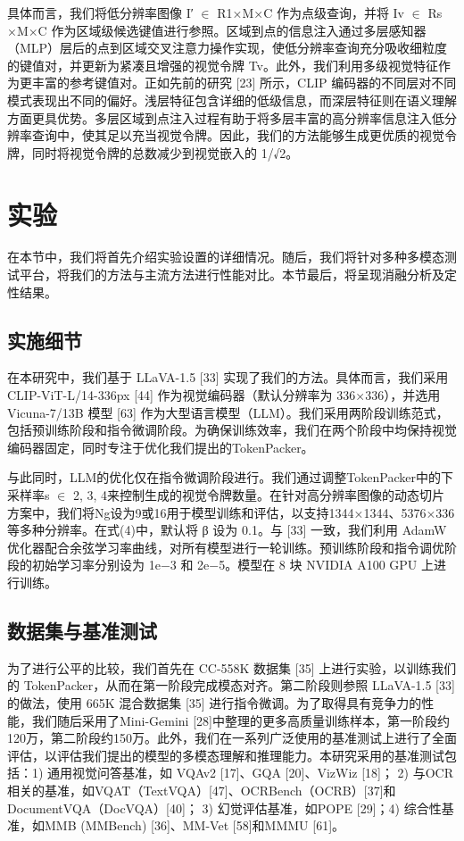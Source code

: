 具体而言，我们将低分辨率图像 I′ $\in$ R1×M×C 作为点级查询，并将 Iv $\in$ Rs ×M×C 作为区域级候选键值进行参照。区域到点的信息注入通过多层感知器（MLP）层后的点到区域交叉注意力操作实现，使低分辨率查询充分吸收细粒度的键值对，并更新为紧凑且增强的视觉令牌 Tv。此外，我们利用多级视觉特征作为更丰富的参考键值对。正如先前的研究 [23] 所示，CLIP 编码器的不同层对不同模式表现出不同的偏好。浅层特征包含详细的低级信息，而深层特征则在语义理解方面更具优势。多层区域到点注入过程有助于将多层丰富的高分辨率信息注入低分辨率查询中，使其足以充当视觉令牌。因此，我们的方法能够生成更优质的视觉令牌，同时将视觉令牌的总数减少到视觉嵌入的 1/√2。

\section{实验}

在本节中，我们将首先介绍实验设置的详细情况。随后，我们将针对多种多模态测试平台，将我们的方法与主流方法进行性能对比。本节最后，将呈现消融分析及定性结果。

\subsection{实施细节}

在本研究中，我们基于 LLaVA-1.5 [33] 实现了我们的方法。具体而言，我们采用 CLIP-ViT-L/14-336px [44] 作为视觉编码器（默认分辨率为 336×336），并选用 Vicuna-7/13B 模型 [63] 作为大型语言模型（LLM）。我们采用两阶段训练范式，包括预训练阶段和指令微调阶段。为确保训练效率，我们在两个阶段中均保持视觉编码器固定，同时专注于优化我们提出的TokenPacker。

与此同时，LLM的优化仅在指令微调阶段进行。我们通过调整TokenPacker中的下采样率s $\in$ {2, 3, 4}来控制生成的视觉令牌数量。在针对高分辨率图像的动态切片方案中，我们将Ng设为9或16用于模型训练和评估，以支持1344×1344、5376×336等多种分辨率。在式(4)中，默认将 β 设为 0.1。与 [33] 一致，我们利用 AdamW 优化器配合余弦学习率曲线，对所有模型进行一轮训练。预训练阶段和指令调优阶段的初始学习率分别设为 1e−3 和 2e−5。模型在 8 块 NVIDIA A100 GPU 上进行训练。

\subsection{数据集与基准测试}

为了进行公平的比较，我们首先在 CC-558K 数据集 [35] 上进行实验，以训练我们的 TokenPacker，从而在第一阶段完成模态对齐。第二阶段则参照 LLaVA-1.5 [33] 的做法，使用 665K 混合数据集 [35] 进行指令微调。为了取得具有竞争力的性能，我们随后采用了Mini-Gemini [28]中整理的更多高质量训练样本，第一阶段约120万，第二阶段约150万。此外，我们在一系列广泛使用的基准测试上进行了全面评估，以评估我们提出的模型的多模态理解和推理能力。本研究采用的基准测试包括：1) 通用视觉问答基准，如 VQAv2 [17]、GQA [20]、VizWiz [18]； 2) 与OCR相关的基准，如VQAT（TextVQA）[47]、OCRBench（OCRB）[37]和DocumentVQA（DocVQA）[40]； 3) 幻觉评估基准，如POPE [29]；4) 综合性基准，如MMB (MMBench) [36]、MM-Vet [58]和MMMU [61]。

